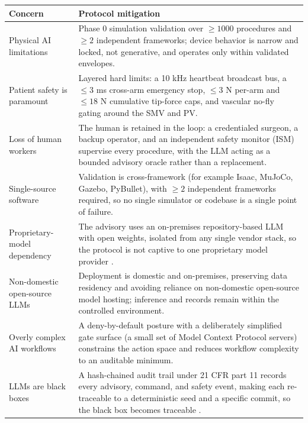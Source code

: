 \vspace{0.3em}

\noindent\begin{tabularx}{\textwidth}{L{5.5cm} Y}
\toprule
\textbf{Concern} & \textbf{Protocol mitigation} \\
\midrule
Physical AI limitations & Phase 0 simulation validation over $\geq 1000$ procedures and $\geq 2$ independent frameworks; device behavior is narrow and locked, not generative, and operates only within validated envelopes. \\
Patient safety is paramount & Layered hard limits: a 10 kHz heartbeat broadcast bus, a $\leq 3$ ms cross-arm emergency stop, $\leq 3$ N per-arm and $\leq 18$ N cumulative tip-force caps, and vascular no-fly gating around the SMV and PV. \\
Loss of human workers & The human is retained in the loop: a credentialed surgeon, a backup operator, and an independent safety monitor (ISM) supervise every procedure, with the LLM acting as a bounded advisory oracle rather than a replacement. \\
Single-source software & Validation is cross-framework (for example Isaac, MuJoCo, Gazebo, PyBullet), with $\geq 2$ independent frameworks required, so no single simulator or codebase is a single point of failure. \\
Proprietary-model dependency & The advisory uses an on-premises repository-based LLM with open weights, isolated from any single vendor stack, so the protocol is not captive to one proprietary model provider \cite{kawchak2025codegen16}. \\
Non-domestic open-source LLMs & Deployment is domestic and on-premises, preserving data residency and avoiding reliance on non-domestic open-source model hosting; inference and records remain within the controlled environment. \\
Overly complex AI workflows & A deny-by-default posture with a deliberately simplified gate surface (a small set of Model Context Protocol servers) constrains the action space and reduces workflow complexity to an auditable minimum. \\
LLMs are black boxes & A hash-chained audit trail under 21 CFR part 11 records every advisory, command, and safety event, making each re-traceable to a deterministic seed and a specific commit, so the black box becomes traceable \cite{kawchak2026adapt312}. \\
\bottomrule
\end{tabularx}
\vspace{-0.6cm}


